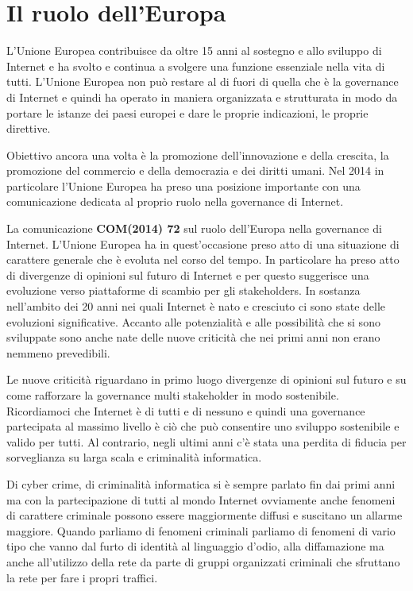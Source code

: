 \section{Il ruolo dell'Europa}
L'Unione Europea contribuisce da oltre 15 anni al sostegno e allo sviluppo di Internet e ha svolto e continua a svolgere una funzione essenziale nella vita di tutti. L'Unione Europea non può restare al di fuori di quella che è la governance di Internet e quindi ha operato in maniera organizzata e strutturata in modo da portare le istanze dei paesi europei e dare le proprie indicazioni, le proprie direttive. \par
Obiettivo ancora una volta è la promozione dell'innovazione e della crescita, la promozione del commercio e della democrazia e dei diritti umani. Nel 2014 in particolare l'Unione Europea ha preso una posizione importante con una comunicazione dedicata al proprio ruolo nella governance di Internet. \par
La comunicazione \textbf{COM(2014) 72} sul ruolo dell'Europa nella governance di Internet. L'Unione Europea ha in quest'occasione preso atto di una situazione di carattere generale che è evoluta nel corso del tempo. In particolare ha preso atto di divergenze di opinioni sul futuro di Internet e per questo suggerisce una evoluzione verso piattaforme di scambio per gli stakeholders. In sostanza nell'ambito dei 20 anni nei quali Internet è nato e cresciuto ci sono state delle evoluzioni significative. Accanto alle potenzialità e alle possibilità che si sono sviluppate sono anche nate delle nuove criticità che nei primi anni non erano nemmeno prevedibili.\par
Le nuove  criticità riguardano in primo luogo divergenze di opinioni sul futuro e su come rafforzare la governance multi stakeholder in modo sostenibile. Ricordiamoci che Internet è di tutti e di nessuno e quindi una governance partecipata al massimo livello è ciò che può consentire uno sviluppo sostenibile e valido per tutti. Al contrario,  negli ultimi anni c'è stata una perdita di fiducia per sorveglianza su larga scala e criminalità informatica. \par
Di cyber crime, di criminalità informatica si è sempre parlato fin dai primi anni ma con la partecipazione di tutti al mondo Internet ovviamente anche fenomeni di carattere criminale possono essere maggiormente diffusi e  suscitano un allarme maggiore. Quando parliamo di fenomeni criminali parliamo di fenomeni di vario tipo che vanno dal furto di identità al linguaggio d'odio, alla diffamazione ma anche all'utilizzo della rete da parte di gruppi organizzati criminali che sfruttano la rete per fare i propri traffici.\par
